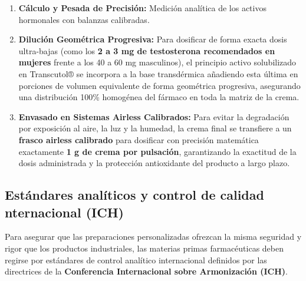 \documentclass[
  spanish,
]{article}
\begin{document}
\begin{enumerate}
\def\labelenumi{\arabic{enumi}.}
\item
  \textbf{Cálculo y Pesada de Precisión:} Medición analítica de los activos hormonales con balanzas calibradas.
\item
  \textbf{Dilución Geométrica Progresiva:} Para dosificar de forma exacta dosis ultra-bajas (como los \textbf{2 a 3 mg de testosterona recomendados en mujeres} frente a los 40 a 60 mg masculinos), el principio activo solubilizado en Transcutol® se incorpora a la base transdérmica añadiendo esta última en porciones de volumen equivalente de forma geométrica progresiva, asegurando una distribución 100\% homogénea del fármaco en toda la matriz de la crema.
\item
  \textbf{Envasado en Sistemas Airless Calibrados:} Para evitar la degradación por exposición al aire, la luz y la humedad, la crema final se transfiere a un \textbf{frasco airless calibrado} para dosificar con precisión matemática exactamente \textbf{1 g de crema por pulsación}, garantizando la exactitud de la dosis administrada y la protección antioxidante del producto a largo plazo.
\end{enumerate}

\subsection{Estándares analíticos y control de calidad nternacional (ICH)}\label{estuxe1ndares-analuxedticos-y-control-de-calidad-nternacional-ich}

Para asegurar que las preparaciones personalizadas ofrezcan la misma seguridad y rigor que los productos industriales, las materias primas farmacéuticas deben regirse por estándares de control analítico internacional definidos por las directrices de la \textbf{Conferencia Internacional sobre Armonización (ICH)}.
\end{document}
